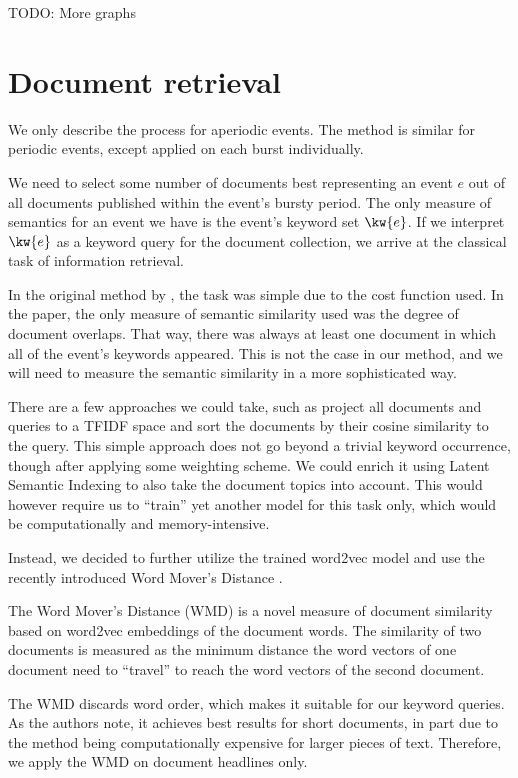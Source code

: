 \begin{enumerate}
{\color{red} TODO: More graphs}


\section{Document retrieval}
We only describe the process for aperiodic events. The method is similar for periodic events, except applied on each burst individually.

We need to select some number of documents best representing an event $e$ out of all documents published within the event's bursty period. The only measure of semantics for an event we have is the event's keyword set $\kw{e}$. If we interpret $\kw{e}$ as a keyword query for the document collection, we arrive at the classical task of information retrieval.

In the original method by \cite{event-detection}, the task was simple due to the cost function used. In the paper, the only measure of semantic similarity used was the degree of document overlaps. That way, there was always at least one document in which all of the event's keywords appeared. This is not the case in our method, and we will need to measure the semantic similarity in a more sophisticated way.

There are a few approaches we could take, such as project all documents and queries to a TFIDF space \cite{information-retrieval} and sort the documents by their cosine similarity to the query. This simple approach does not go beyond a trivial keyword occurrence, though after applying some weighting scheme. We could enrich it using Latent Semantic Indexing \cite{lsi} to also take the document topics into account. This would however require us to ``train'' yet another model for this task only, which would be computationally and memory-intensive.

Instead, we decided to further utilize the trained word2vec model and use the recently introduced Word Mover's Distance \cite{wmd}.

The Word Mover's Distance (WMD) is a novel measure of document similarity based on word2vec embeddings of the document words. The similarity of two documents is measured as the minimum distance the word vectors of one document need to ``travel'' to reach the word vectors of the second document.

The WMD discards word order, which makes it suitable for our keyword queries. As the authors note, it achieves best results for short documents, in part due to the method being computationally expensive for larger pieces of text. Therefore, we apply the WMD on document headlines only.


\end{enumerate}
